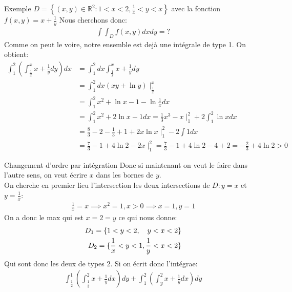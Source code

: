 

\begin{parag}{Exemple}
	$D = \left\{(x, y) \in \mathbb{R}^{2}: 1 < x < 2, \frac{1}{x} < y  < x \right\}$ avec la fonction $f\left(x, y\right) = x + \frac{1}{y}$ Nous cherchons donc:
	\begin{align*} \int\int_D f(x, y)dxdy = ? \end{align*}
	Comme on peut le voire, notre ensemble est dejà une intégrale de type 1. On obtient:
	\begin{align*} \int_1^2 \left( \int_{\frac{1}{x}}^x x + \frac{1}{y}dy \right) dx &= \int_1^2dx \int_{\frac{1}{x}}^x x + \frac{1}{y}dy\\
	&= \int_1^2dx (xy + \ln y)\mid_{\frac{1}{x}}^x\\
	&= \int_1^2 x^2 + \ln x - 1 - \ln \frac{1}{x} dx\\
	&= \int_1^2 x^2 + 2\ln x - 1 dx =  \frac{1}{3}x^3 - x \mid_1^2 + 2 \int_1^2 \ln x dx \\
	&= \frac{8}{3} -2 - \frac{1}{3} + 1 + 2x\ln x \mid_1^2 - 2\int 1dx\\
	&= \frac{7}{3} - 1 + 4\ln 2 - 2x\mid_1^2 = \frac{7}{3} - 1 + 4\ln 2 - 4 + 2 = -\frac{2}{3} + 4 \ln 2 > 0
	\end{align*}
\end{parag}

\begin{parag}{Changement d'ordre par intégration}
    Donc si maintenant on veut le faire dans l'autre sens, on veut écrire $x$ dans les bornes de $y$.\\
    On cherche en premier lieu l'intersection les deux intersections de $D: y = x$ et $y =  \frac{1}{x}$:
    \begin{align*} 
	    \frac{1}{x} =  x \implies x^2 = 1, x > 0 \implies x =  1, y = 1
    \end{align*}
    On a donc le max qui est $x =  2= y$ ce qui nous donne:
    \begin{align*} D_1 = \{1 < y < 2, \quad y < x < 2\}\\
	    D_2 =  \{\frac{1}{x} < y < 1, \frac{1}{y} < x < 2\}
    \end{align*}
    Qui sont donc les deux de types $2$. Si on écrit donc l'intégrae:
    \begin{align*} 
	    \int_{\frac{1}{2}}^1 \left(\int_{\frac{1}{y}}^2 x + \frac{1}{y}dx\right) dy + \int_1^2 \left(\int_y^2 x + \frac{1}{y}dx\right) dy
    \end{align*}
\end{parag}




